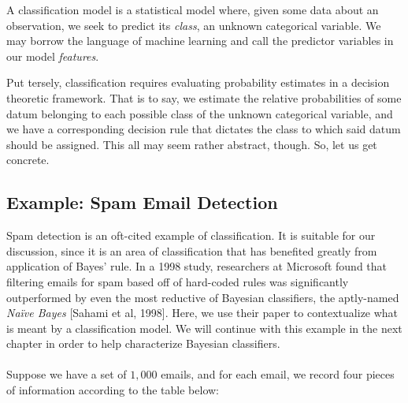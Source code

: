 \documentclass[12pt,twoside]{reedthesis}
\begin{document}
A classification model is a statistical model where, given some data about an observation, we seek to predict its {\em class}, an unknown categorical variable. We may borrow the language of machine learning and call the predictor variables in our model {\em features}.

Put tersely, classification requires evaluating probability estimates in a decision theoretic framework. That is to say, we estimate the relative probabilities of some datum belonging to each possible class of the unknown categorical variable, and we have a corresponding decision rule that dictates the class to which said datum should be assigned. This all may seem rather abstract, though. So, let us get concrete.

	\subsection*{Example: Spam Email Detection}
	Spam detection is an oft-cited example of classification. It is suitable for our discussion, since it is an area of classification that has benefited greatly from application of Bayes' rule. In a 1998 study, researchers at Microsoft found that filtering emails for spam based off of hard-coded rules was significantly outperformed by even the most reductive of Bayesian classifiers, the aptly-named {\em Na\"{i}ve Bayes} [Sahami et al, 1998]. Here, we use their paper to contextualize what is meant by a classification model. We will continue with this example in the next chapter in order to help characterize Bayesian classifiers. \\ \\
	
	Suppose we have a set of $1,000$ emails, and for each email, we record four pieces of information according to the table below:
	
\end{document}
